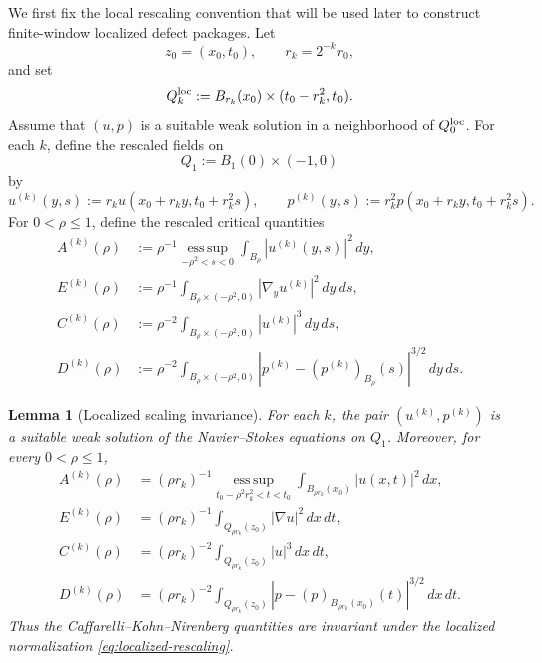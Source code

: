 \documentclass[11pt]{article}
\numberwithin{equation}{section}
\newtheorem{lemma}[theorem]{Lemma}
\newcommand{\dd}{\,d}
\begin{document}
We first fix the local rescaling convention that will be used later to
construct finite-window localized defect packages.  Let
\[
        z_0=(x_0,t_0),\qquad r_k=2^{-k}r_0,
\]
and set
\[
        Q_k^{\rm loc}
        :=
        B_{r_k}(x_0)\times(t_0-r_k^2,t_0).
\]
Assume that \((u,p)\) is a suitable weak solution in a neighborhood of
\(Q_0^{\rm loc}\).  For each \(k\), define the rescaled fields on
\[
        Q_1:=B_1(0)\times(-1,0)
\]
by
\begin{equation}\label{eq:localized-rescaling}
        u^{(k)}(y,s)
        :=
        r_k u(x_0+r_k y,t_0+r_k^2s),
        \qquad
        p^{(k)}(y,s)
        :=
        r_k^2 p(x_0+r_k y,t_0+r_k^2s).
\end{equation}
For \(0<\rho\le1\), define the rescaled critical quantities
\begin{align*}
        A^{(k)}(\rho)
        &:=
        \rho^{-1}
        \operatorname*{ess\,sup}_{-\rho^2<s<0}
        \int_{B_\rho}|u^{(k)}(y,s)|^2\dd y,\\
        E^{(k)}(\rho)
        &:=
        \rho^{-1}
        \int_{B_\rho\times(-\rho^2,0)}
        |\nabla_yu^{(k)}|^2\dd y\dd s,\\
        C^{(k)}(\rho)
        &:=
        \rho^{-2}
        \int_{B_\rho\times(-\rho^2,0)}
        |u^{(k)}|^3\dd y\dd s,\\
        D^{(k)}(\rho)
        &:=
        \rho^{-2}
        \int_{B_\rho\times(-\rho^2,0)}
        \left|
        p^{(k)}-(p^{(k)})_{B_\rho}(s)
        \right|^{3/2}\dd y\dd s .
\end{align*}

\begin{lemma}[Localized scaling invariance]\label{lem:localized-scaling-invariance}
For each \(k\), the pair \((u^{(k)},p^{(k)})\) is a suitable weak solution
of the Navier--Stokes equations on \(Q_1\).  Moreover, for every
\(0<\rho\le1\),
\begin{align}
        A^{(k)}(\rho)
        &=
        (\rho r_k)^{-1}
        \operatorname*{ess\,sup}_{t_0-\rho^2r_k^2<t<t_0}
        \int_{B_{\rho r_k}(x_0)}|u(x,t)|^2\dd x,\label{eq:scaled-A}\\
        E^{(k)}(\rho)
        &=
        (\rho r_k)^{-1}
        \int_{Q_{\rho r_k}(z_0)}
        |\nabla u|^2\dd x\dd t,\label{eq:scaled-E}\\
        C^{(k)}(\rho)
        &=
        (\rho r_k)^{-2}
        \int_{Q_{\rho r_k}(z_0)}
        |u|^3\dd x\dd t,\label{eq:scaled-C}\\
        D^{(k)}(\rho)
        &=
        (\rho r_k)^{-2}
        \int_{Q_{\rho r_k}(z_0)}
        \left|
        p-(p)_{B_{\rho r_k}(x_0)}(t)
        \right|^{3/2}\dd x\dd t.\label{eq:scaled-D}
\end{align}
Thus the Caffarelli--Kohn--Nirenberg quantities are invariant under the
localized normalization \eqref{eq:localized-rescaling}.
\end{lemma}
\end{document}
